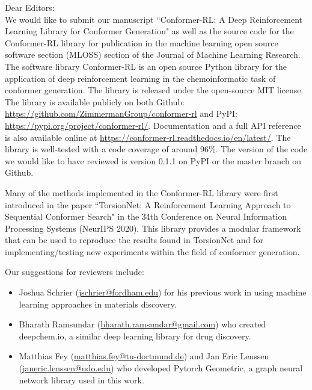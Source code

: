 \documentclass[twoside,11pt]{article}
\begin{document}
    \noindent Dear Editors: \\
    
    We would like to submit our manuscript ``Conformer-RL: A Deep Reinforcement Learning Library for Conformer Generation" as well as the source code for the Conformer-RL library for publication in the machine learning open source software section (MLOSS) section of the Journal of Machine Learning Research. The software library Conformer-RL is an open source Python library for the application of deep reinforcement learning in the chemoinformatic task of conformer generation. The library is released under the open-source MIT license. The library is available publicly on both Github: \url{https://github.com/ZimmermanGroup/conformer-rl} and PyPI: \url{https://pypi.org/project/conformer-rl/}. Documentation and a full API reference is also available online at \url{https://conformer-rl.readthedocs.io/en/latest/}. The library is well-tested with a code coverage of around 96\%. The version of the code we would like to have reviewed is version 0.1.1 on PyPI or the master branch on Github. 
    
    \medskip

    Many of the methods implemented in the Conformer-RL library were first introduced in the paper ``TorsionNet: A Reinforcement Learning Approach to Sequential Conformer Search" in the 34th Conference on Neural Information Processing Systems (NeurIPS 2020). This library provides a modular framework that can be used to reproduce the results found in TorsionNet and for implementing/testing new experiments within the field of conformer generation.

    \medskip
    
    Our suggestions for reviewers include:
    \begin{itemize}
        \item Joshua Schrier (\url{jschrier@fordham.edu}) for his previous work in using machine learning approaches in materials discovery.
        \item Bharath Ramsundar (\url{bharath.ramsundar@gmail.com}) who created deepchem.io, a similar deep learning library for drug discovery.
        \item Matthias Fey (\url{matthias.fey@tu-dortmund.de}) and Jan Eric Lenssen (\url{janeric.lenssen@udo.edu}) who developed Pytorch Geometric, a graph neural network library used in this work.
    \end{itemize}
\end{document}

